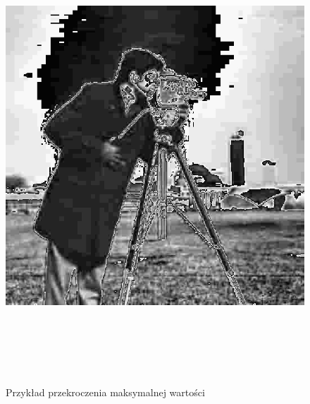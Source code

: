 \documentclass[a4paper,12pt]{book}
\begin{document}
\begin{figure}[H]
	\caption{Przykład przekroczenia maksymalnej wartości}
	\includegraphics[width=17cm, height=17cm]{2/multiply-gray-const-error.png}
\end{figure}
\end{document}
